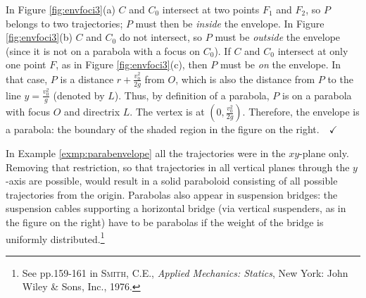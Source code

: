 \begin{exmp}
\noindent In Figure \ref{fig:envfoci3}(a) $C$ and $C_0$ intersect at two points
$F_1$ and $F_2$, so $P$ belongs to two trajectories; $P$ must then be
\emph{inside} the envelope. In Figure \ref{fig:envfoci3}(b) $C$ and $C_0$ do not
intersect, so $P$ must be \emph{outside} the envelope (since it is not
on a parabola with a focus on $C_0$). If $C$ and $C_0$ intersect at only
one point $F$, as in Figure \ref{fig:envfoci3}(c), then $P$ must be \emph{on}
the envelope. In that case, $P$ is a distance $r+\frac{v_0^2}{2g}$ from $O$,
which is also the distance from $P$ to the line $y=\frac{v_0^2}{g}$ (denoted by
$L$). Thus, by definition of a parabola, $P$ is on a parabola with focus $O$ and
directrix $L$. The vertex is at
$\left(0,\frac{v_0^2}{2g}\right)$. Therefore, the envelope is a parabola: the
boundary of the shaded region in the figure on the right.$\quad\checkmark$
\end{exmp}
\divider
\newpage
In Example \ref{exmp:parabenvelope} all the trajectories were in the $xy$-plane
only. Removing that restriction, so that trajectories in all vertical planes
through the $y$-axis are possible, would result in a solid paraboloid
consisting of all possible trajectories from the origin.
Parabolas also appear in suspension bridges: the suspension cables supporting a
horizontal bridge (via vertical suspenders, as in the figure on the right) have
to be parabolas if the weight of the bridge is uniformly
distributed.\footnote{See pp.159-161 in \textsc{Smith, C.E.}, \emph{Applied
Mechanics: Statics}, New York: John Wiley \& Sons, Inc., 1976.}\vspace{2mm}

